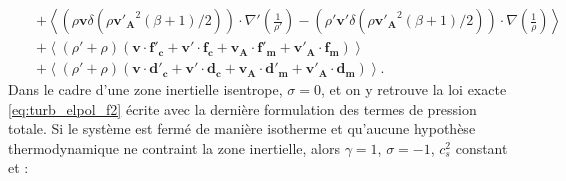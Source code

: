 \begin{equation}
{\begin{array}{lcl}
&&+ \left< \left(\rho\boldsymbol{v} \delta \left(\rho\boldsymbol{v'_A}^2\left(\beta +1\right)/2\right) \right) \cdot \nabla'\left(\frac{1}{\rho'}\right) - \left(\rho' \boldsymbol{v'}\delta \left(\rho\boldsymbol{v'_A}^2\left(\beta +1\right)/2\right) \right) \cdot \nabla \left(\frac{1}{\rho}\right)\right>\\%
&&+  \left<\left(\rho' + \rho\right)\left(\boldsymbol{v} \cdot \boldsymbol{f'_c} + \boldsymbol{v'} \cdot \boldsymbol{f_c} + \boldsymbol{v_A} \cdot \boldsymbol{f'_m} + \boldsymbol{v'_A} \cdot \boldsymbol{f_m}\right) \right>\\%
&&+ \left<\left(\rho' + \rho\right)\left(\boldsymbol{v} \cdot \boldsymbol{d'_c} + \boldsymbol{v'} \cdot \boldsymbol{d_c}+\boldsymbol{v_A} \cdot \boldsymbol{d'_m} + \boldsymbol{v'_A} \cdot \boldsymbol{d_m}\right)\right> .
\end{array}}
\end{equation}
 Dans le cadre d'une zone inertielle isentrope, $\sigma=0$, et on y retrouve la loi exacte \eqref{eq:turb_elpol_f2} écrite avec la dernière formulation des termes de pression totale. Si le système est fermé de manière isotherme et qu'aucune hypothèse thermodynamique ne contraint la zone inertielle, alors $\gamma = 1$, $\sigma = -1$, $c^2_s$ constant et :  
